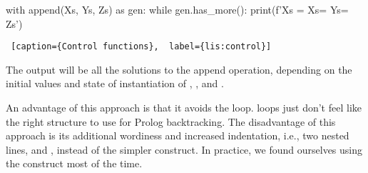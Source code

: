 \begin{minipage}{\linewidth}  \largev \hrulefill
\begin{python}[numbers=left]
with append(Xs, Ys, Zs) as gen:
  while gen.has_more():
    print(f'Xs = {Xs}\nYs = {Ys}\nZs = {Zs}\n')
\end{python}
\begin{lstlisting} [caption={Control functions},  label={lis:control}]
\end{lstlisting}
\end{minipage}
The output will be all the solutions to the append operation, depending on the initial values and state of instantiation of , , and .

An advantage of this approach is that it avoids the  loop.  loops just don't feel like the right structure to use for Prolog backtracking. The disadvantage of this approach is its additional wordiness and increased indentation, i.e., two nested lines,  and , instead of the simpler  construct. In practice, we found ourselves using the  construct most of the time.